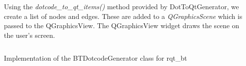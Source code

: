 \documentclass[\rootfolder/main.tex]{subfiles}
\begin{document}
Using the \emph{dotcode\_to\_qt\_items()} method provided by DotToQtGenerator, we create a list of nodes and edges.
These are added to a \emph{QGraphicsScene} which is passed to the QGraphicsView.
The QGraphicsView widget draws the scene on the user's screen.

\begin{listing}
    \inputminted{python}{\rootfolder/Chapters/Chapter4/Listings/dotcode.py}
    \caption{Implementation of the BTDotcodeGenerator class for rqt\_bt}
    \label{lst:btdotcode}
\end{listing}
\end{document}
